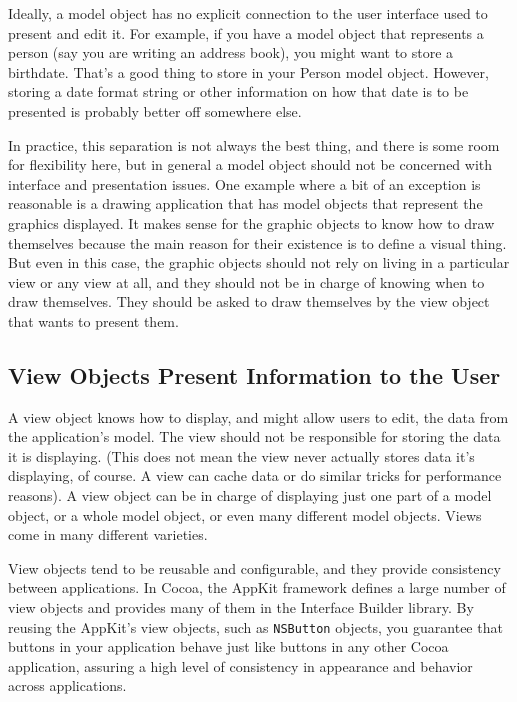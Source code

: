 Ideally, a model object has no explicit connection to the user interface used to
present and edit it. For example, if you have a model object that represents a
person (say you are writing an address book), you might want to store a
birthdate. That's a good thing to store in your Person model object. However,
storing a date format string or other information on how that date is to be
presented is probably better off somewhere else.

In practice, this separation is not always the best thing, and there is some
room for flexibility here, but in general a model object should not be concerned
with interface and presentation issues. One example where a bit of an exception
is reasonable is a drawing application that has model objects that represent the
graphics displayed. It makes sense for the graphic objects to know how to draw
themselves because the main reason for their existence is to define a visual
thing. But even in this case, the graphic objects should not rely on living in a
particular view or any view at all, and they should not be in charge of knowing
when to draw themselves. They should be asked to draw themselves by the view
object that wants to present them.

\subsection{View Objects Present Information to the User}

A view object knows how to display, and might allow users to edit, the data from
the application's model. The view should not be responsible for storing the data
it is displaying. (This does not mean the view never actually stores data it's
displaying, of course. A view can cache data or do similar tricks for
performance reasons). A view object can be in charge of displaying just one part
of a model object, or a whole model object, or even many different model
objects. Views come in many different varieties.

View objects tend to be reusable and configurable, and they provide consistency
between applications. In Cocoa, the AppKit framework defines a large number of
view objects and provides many of them in the Interface Builder library. By
reusing the AppKit's view objects, such as \texttt{NSButton} objects, you
guarantee that buttons in your application behave just like buttons in any other
Cocoa application, assuring a high level of consistency in appearance and
behavior across applications.

